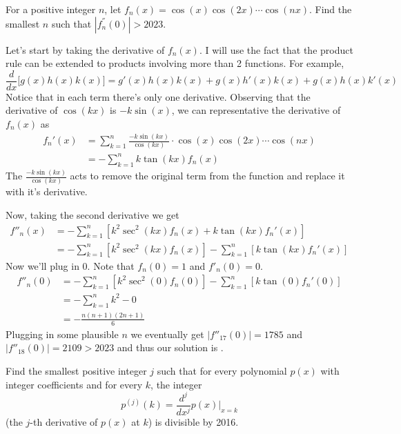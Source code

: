 \begin{problem}[Z][5][Putnam 2023/A1]
    For a positive integer $n$, let $f_n(x)=\cos(x) \cos(2x) \cdots \cos(nx)$. Find the smallest $n$ such that $|f_n^{''}(0)|>2023$.
\end{problem}

\begin{solution}[18]
    Let's start by taking the derivative of $f_n(x)$. I will use the fact that the product rule can be extended to products involving more than 2 functions. For example,
    \[
        \frac{d}{dx}\big[g(x)h(x)k(x)\big]=g'(x)h(x)k(x)+g(x)h'(x)k(x)+g(x)h(x)k'(x)
    \]
    Notice that in each term there's only one derivative. Observing that the derivative of $\cos(kx)$ is $-k\sin(x)$, we can representative the derivative of $f_n(x)$ as
    \begin{align*}
        f_n'(x) &= \sum_{k=1}^n\frac{-k\sin(kx)}{\cos(kx)}\cdot\cos(x) \cos(2x) \cdots \cos(nx) \\
        &= -\sum_{k=1}^nk\tan(kx)f_n(x)
    \end{align*}
    The $\frac{-k\sin(kx)}{\cos(kx)}$ acts to remove the original term from the function and replace it with it's derivative.

    Now, taking the second derivative we get
    \begin{align*}
        f''_n(x) &= -\sum_{k=1}^n\left[k^2\sec^2(kx)f_n(x)+k\tan(kx)f_n'(x)\right] \\
        &= -\sum_{k=1}^n\left[k^2\sec^2(kx)f_n(x)\right]-\sum_{k=1}^n\left[k\tan(kx)f_n'(x)\right]
    \end{align*}
    Now we'll plug in $0$. Note that $f_n(0)=1$ and $f'_n(0)=0$.
    \begin{align*}
        f''_n(0) &= -\sum_{k=1}^n\left[k^2\sec^2(0)f_n(0)\right]-\sum_{k=1}^n\left[k\tan(0)f_n'(0)\right]\\[1mm]
        &= -\sum_{k=1}^nk^2-0\\[1mm]
        &= -\frac{n(n+1)(2n+1)}{6}
    \end{align*}
    Plugging in some plausible $n$ we eventually get $|f''_{17}(0)|=1785$ and $|f''_{18}(0)|=2109>2023$ and thus our solution is .
\end{solution}
\newpageSol
\begin{problem}[Z][6][Putnam 2016/A1]
    Find the smallest positive integer \( j \) such that for every polynomial \( p(x) \) with integer coefficients and for every \( k \), the integer
\[
p^{(j)}(k) = \frac{d^j}{dx^j}p(x) \bigg|_{x=k}
\]
(the \( j \)-th derivative of \( p(x) \) at \( k \)) is divisible by 2016.
\end{problem}

